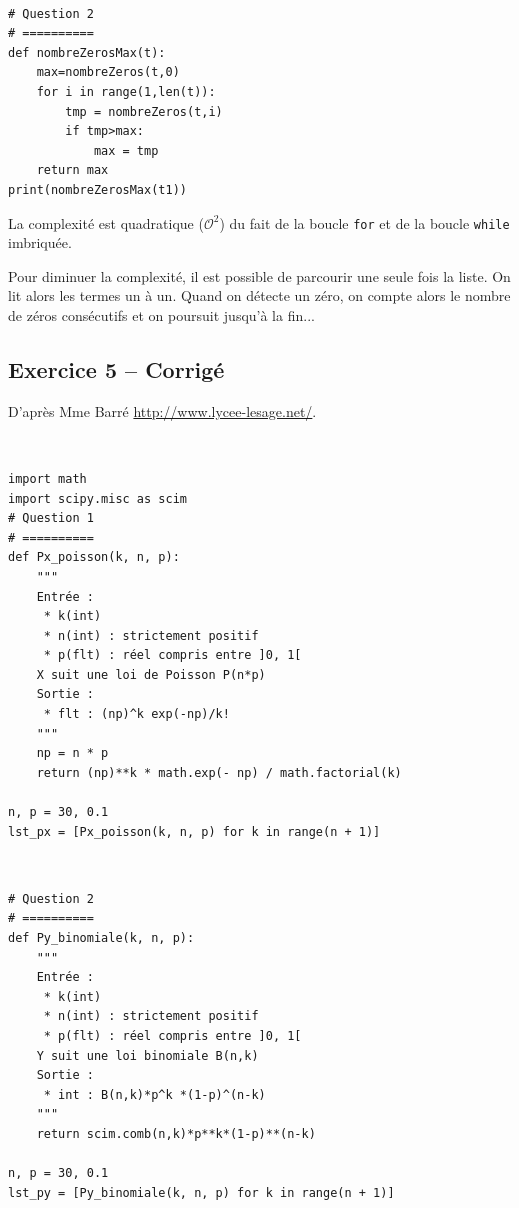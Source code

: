 \documentclass[10pt,fleqn]{article} %
\begin{document}
\begin{corrige}
$\quad$
\begin{lstlisting}
# Question 2
# ==========
def nombreZerosMax(t):
    max=nombreZeros(t,0)
    for i in range(1,len(t)):
        tmp = nombreZeros(t,i)
        if tmp>max:
            max = tmp
    return max
print(nombreZerosMax(t1))
\end{lstlisting}
\end{corrige}

\begin{corrige}
La complexité est quadratique ($\mathcal{O}^2$)  du fait de la boucle \texttt{for} et de la boucle \texttt{while} imbriquée.

Pour diminuer la complexité, il est possible de parcourir une seule fois la liste. On lit alors les termes un à un. Quand on détecte un zéro, on compte alors le nombre de zéros consécutifs et on poursuit jusqu'à la fin...

\end{corrige}

\subsection*{Exercice 5 -- Corrigé}
D'après Mme Barré \url{http://www.lycee-lesage.net/}.


\begin{corrige}
$\quad$
\begin{lstlisting}
import math
import scipy.misc as scim
# Question 1 
# ==========
def Px_poisson(k, n, p):
    """
    Entrée : 
     * k(int)
     * n(int) : strictement positif
     * p(flt) : réel compris entre ]0, 1[
    X suit une loi de Poisson P(n*p)
    Sortie : 
     * flt : (np)^k exp(-np)/k!
    """
    np = n * p
    return (np)**k * math.exp(- np) / math.factorial(k)

n, p = 30, 0.1
lst_px = [Px_poisson(k, n, p) for k in range(n + 1)]
\end{lstlisting}
\end{corrige}

\begin{corrige}
$\quad$
\begin{lstlisting}
# Question 2
# ==========
def Py_binomiale(k, n, p):
    """
    Entrée : 
     * k(int)
     * n(int) : strictement positif
     * p(flt) : réel compris entre ]0, 1[
    Y suit une loi binomiale B(n,k)
    Sortie : 
     * int : B(n,k)*p^k *(1-p)^(n-k)
    """
    return scim.comb(n,k)*p**k*(1-p)**(n-k)

n, p = 30, 0.1
lst_py = [Py_binomiale(k, n, p) for k in range(n + 1)]
\end{lstlisting}
\end{corrige}
\end{document}
